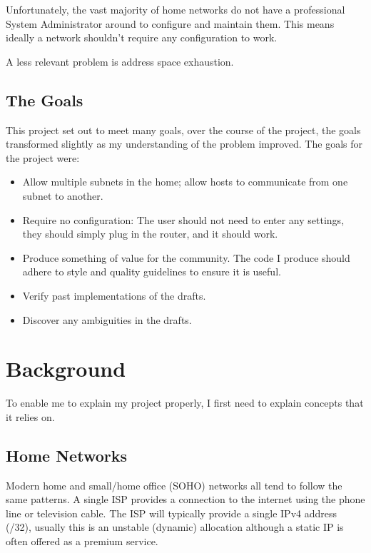 \documentclass[12pt]{report}
\begin{document}
Unfortunately, the vast majority of home networks do not have a professional
System Administrator around to configure and maintain them. This means ideally
a network shouldn't require any configuration to work.

A less relevant problem is 
address space exhaustion. 

\section{The Goals}
This project set out to meet many goals, over the course of the project, the
goals transformed slightly as my understanding of the problem improved. The
goals for the project were:
\begin{itemize}
\item Allow multiple subnets in the home; allow hosts to communicate from one
  subnet to another.
\item Require no configuration: The user should not need to enter any settings,
  they should simply plug in the router, and it should work.
\item Produce something of value for the community. The code I produce should
  adhere to style and quality guidelines to ensure it is useful.
\item Verify past implementations of the drafts.
\item Discover any ambiguities in the drafts.
\end{itemize}


\chapter{Background}
To enable me to explain my project properly, I first need to explain concepts
that it relies on.

\section{Home Networks}
Modern home and small/home office (SOHO)  networks all tend to follow the same patterns. A single ISP
provides a connection to the internet using the phone line or television cable.
The ISP will typically provide a single IPv4 address (/32), usually this is an
unstable (dynamic) allocation although a static IP is often offered as a
premium service. 
\end{document}
